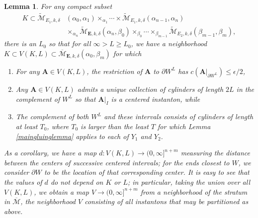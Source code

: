 \documentclass{memo-l}
\newtheorem{lemma}[theorem]{Lemma}
\theoremstyle{definition}
\theoremstyle{remark}
\numberwithin{section}{chapter}
\numberwithin{equation}{chapter}
\begin{document}
\begin{lemma}\label{finalbit}For any compact subset \begin{align*}K \subset \widetilde{\mathcal M}_{E_1, k, \delta}&(\alpha_0, \alpha_1) \times_{\alpha_1} \cdots \times \widetilde{\mathcal M}_{E_1, k, \delta}(\alpha_{n-1}, \alpha_n)\\
&\times_{\alpha_n} \widetilde{\mathcal M}_{\mathbf{E},k,\delta}(\alpha_n, \beta_0) \times_{\beta_0} \cdots \times_{\beta_{m-1}} \widetilde{\mathcal M}_{E_2, k, \delta}(\beta_{m-1}, \beta_m),\end{align*} there is an $L_0$ so that for all $\infty > L \geq L_0$, we have a neighborhood $K \subset V(K,L) \subset \overline{\mathcal M}_{\mathbf{E},k,\delta}(\alpha_0, \beta_m)$ for which \begin{enumerate}
\item For any $\mathbf{A} \in V(K,L)$, the restriction of $\mathbf{A}$ to $\partial W^L$ has $c(\mathbf{A}\big|_{\partial W^L}) \leq \epsilon/2$, \\
\item Any $\mathbf{A} \in V(K,L)$ admits a unique collection of cylinders of length $2L$ in the complement of $W^L$ so that $\mathbf{A}\big|_{I}$ is a centered instanton, while \\
\item The complement of both $W^L$ and these intervals consists of cylinders of length at least $T_0$, where $T_0$ is larger than the least $T$ for which Lemma \ref{maingluinglemma} applies to each of $Y_1$ and $Y_2$.
\end{enumerate}

As a corollary, we have a map $d: V(K,L) \to (0,\infty]^{n+m}$ measuring the distance between the centers of successive centered intervals; for the ends closest to $W$, we consider $\partial W$ to be the location of that corresponding center. It is easy to see that the values of $d$ do not depend on $K$ or $L$; in particular, taking the union over all $V(K, L)$, we obtain a map $V \to (0,\infty]^{n+m}$ from a neighborhood of the stratum in $\overline{\mathcal M}$, the neighborhood $V$ consisting of all instantons that may be partitioned as above.
\end{lemma}
\end{document}
